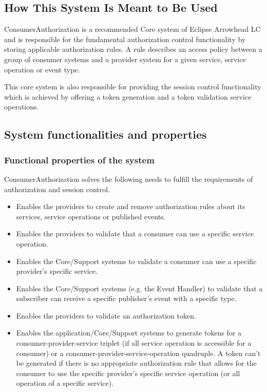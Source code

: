 \documentclass[a4paper]{arrowhead}
\begin{document}
\subsection{How This System Is Meant to Be Used}
\label{sec:use}

ConsumerAuthorization is a recommended Core system of Eclipse Arrowhead LC and is responsible for the fundamental authorization control functionality by storing applicable authorization rules. A rule describes an access policy between a group of consumer systems and a provider system for a given service, service operation or event type.

This core system is also responsible for providing the session control functionality which is achieved by offering a token generation and a token validation service operations. 

\subsection{System functionalities and properties}
\label{sec:properties}

\subsubsection {Functional properties of the system}

ConsumerAuthorization solves the following needs to fulfill the requirements of authorization and session control.

\begin{itemize}
    \item Enables the providers to create and remove authorization rules about its services, service operations or published events.
    \item Enables the providers to validate that a consumer can use a specific service operation.
    \item Enables the Core/Support systems to validate a consumer can use a specific provider's specific service.
    \item Enables the Core/Support systems (e.g. the Event Handler) to validate that a subscriber can receive a specific publisher's event with a specific type.
    \item Enables the providers to validate an authorization token.
    \item Enables the application/Core/Support systems to generate tokens for a consumer-provider-service triplet (if all service operation is accessible for a consumer) or a consumer-provider-service-operation quadruple.
    A token can't be generated if there is no appropriate authorization rule that allows for the consumer to use the specific provider's specific service operation (or all operation of a specific service). 
\end{itemize}
\end{document}
